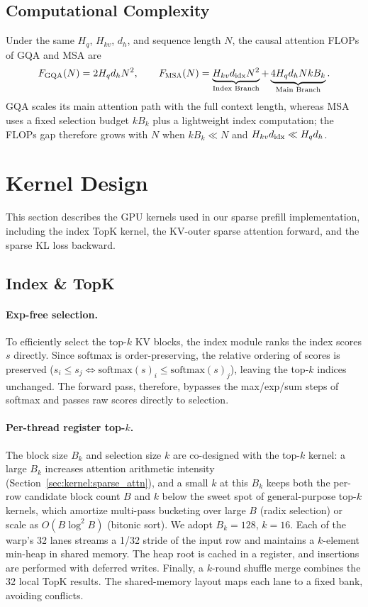 \documentclass{llmxive}
\providecommand{\method}{\textsc{MSA}}
\begin{document}
\subsection{Computational Complexity}
\label{sec:msa-flops}

Under the same $H_q$, $H_{kv}$, $d_h$, and sequence length $N$, the causal attention FLOPs of GQA and \method{} are
\begin{equation}
F_{\rm GQA}(N)= 2 H_q d_h N^2,
\qquad
F_{\method{}}(N)= \underbrace{H_{kv} d_{\rm idx} N^2}_{\text{Index Branch}}
 + \underbrace{4 H_q d_h Nk B_k}_{\text{Main Branch}} .
\end{equation}
GQA scales its main attention path with the full context length, whereas \method{} uses a fixed selection budget $kB_k$ plus a lightweight index computation; the FLOPs gap therefore grows with $N$ when $kB_k \ll N$ and $H_{kv}d_{\rm idx} \ll H_qd_h$.

\section{Kernel Design}
\label{sec:infrastructure}

This section describes the GPU kernels used in our sparse prefill implementation, including the index TopK kernel, the KV-outer sparse attention forward, and the sparse KL loss backward.

\subsection{Index \& TopK}

\paragraph{Exp-free selection.}
To efficiently select the top-$k$ KV blocks, the index module ranks the index scores $s$ directly. Since softmax is order-preserving, the relative ordering of scores is preserved ($s_i \le s_j \iff \mathrm{softmax}(s)_i \le \mathrm{softmax}(s)_j$), leaving the top-$k$ indices unchanged. The forward pass, therefore, bypasses the max/exp/sum steps of softmax and passes raw scores directly to selection.

\paragraph{Per-thread register top-\texorpdfstring{$k$}{k}.}
The block size $B_k$ and selection size $k$ are co-designed with the top-$k$ kernel: a large $B_k$ increases attention arithmetic intensity (Section~\ref{sec:kernel:sparse_attn}), and a small $k$ at this $B_k$ keeps both the per-row candidate block count $B$ and $k$ below the sweet spot of general-purpose top-$k$ kernels, which amortize multi-pass bucketing over large $B$ (radix selection) or scale as $O(B \log^2 B)$ (bitonic sort). We adopt $B_k = 128$, $k = 16$. Each of the warp's 32 lanes streams a 1/32 stride of the input row and maintains a $k$-element min-heap in shared memory. The heap root is cached in a register, and insertions are performed with deferred writes. Finally, a $k$-round shuffle merge combines the 32 local TopK results. The shared-memory layout maps each lane to a fixed bank, avoiding conflicts.
\end{document}
